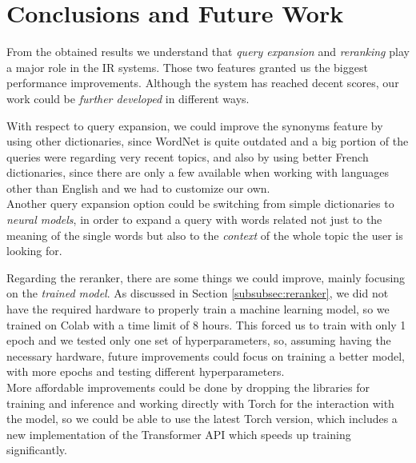 \section{Conclusions and Future Work}
\label{sec:conclusion}

From the obtained results we understand that \emph{query expansion} and \emph{reranking} play a major role in the \ac{IR} systems. Those two features granted us the biggest performance improvements. Although the system has reached decent scores, our work could be  \emph{further developed} in different ways.

With respect to query expansion, we could improve the synonyms feature by using other dictionaries, since WordNet is quite outdated and a big portion of the queries were regarding very recent topics, and also by using better French dictionaries, since there are only a few available when working with languages other than English and we had to customize our own. \\
Another query expansion option could be switching from simple dictionaries to \emph{neural models}, in order to expand a query with words related not just to the meaning of the single words but also to the \emph{context} of the whole topic the user is looking for.

Regarding the reranker, there are some things we could improve, mainly focusing on the  \emph{trained model}. As discussed in Section \ref{subsubsec:reranker}, we did not have the required hardware to properly train a machine learning model, so we trained on Colab with a time limit of 8 hours. This forced us to train with only 1 epoch and we tested only one set of hyperparameters, so, assuming having the necessary hardware, future improvements could focus on training a better model, with more epochs and testing different hyperparameters.\\
More affordable improvements could be done by dropping the libraries for training and inference and working directly with Torch for the interaction with the model, so we could be able to use the latest Torch version, which includes a new implementation of the Transformer API which speeds up training significantly.